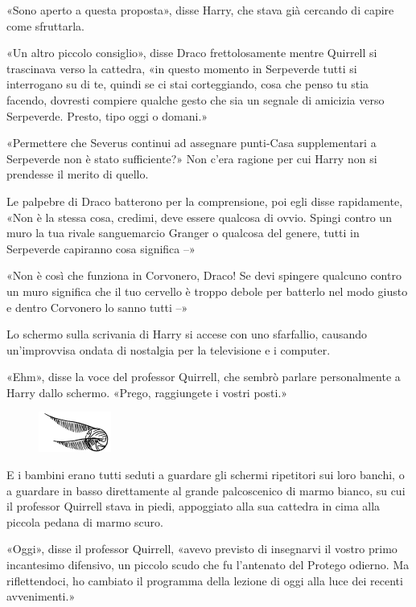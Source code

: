 «Sono aperto a questa proposta», disse Harry, che stava già cercando di capire come sfruttarla.

«Un altro piccolo consiglio», disse Draco frettolosamente mentre Quirrell si trascinava verso la cattedra, «in questo momento in Serpeverde tutti si interrogano su di te, quindi se ci stai corteggiando, cosa che penso tu stia facendo, dovresti compiere qualche gesto che sia un segnale di amicizia verso Serpeverde. Presto, tipo oggi o domani.»

«Permettere che Severus continui ad assegnare punti-Casa supplementari a Serpeverde non è stato sufficiente?» Non c’era ragione per cui Harry non si prendesse il merito di quello.

Le palpebre di Draco batterono per la comprensione, poi egli disse rapidamente, «Non è la stessa cosa, credimi, deve essere qualcosa di ovvio. Spingi contro un muro la tua rivale sanguemarcio Granger o qualcosa del genere, tutti in Serpeverde capiranno cosa significa –»

«Non è così che funziona in Corvonero, Draco! Se devi spingere qualcuno contro un muro significa che il tuo cervello è troppo debole per batterlo nel modo giusto e dentro Corvonero lo sanno tutti –»

Lo schermo sulla scrivania di Harry si accese con uno sfarfallio, causando un’improvvisa ondata di nostalgia per la televisione e i computer.

«Ehm», disse la voce del professor Quirrell, che sembrò parlare personalmente a Harry dallo schermo. «Prego, raggiungete i vostri posti.»

\begin{figure}[h!]
        \includegraphics[scale=0.4]{boccino.png}
        \centering
\end{figure}

E i bambini erano tutti seduti a guardare gli schermi ripetitori sui loro banchi, o a guardare in basso direttamente al grande palcoscenico di marmo bianco, su cui il professor Quirrell stava in piedi, appoggiato alla sua cattedra in cima alla piccola pedana di marmo scuro.

«Oggi», disse il professor Quirrell, «avevo previsto di insegnarvi il vostro primo incantesimo difensivo, un piccolo scudo che fu l’antenato del Protego odierno. Ma riflettendoci, ho cambiato il programma della lezione di oggi alla luce dei recenti avvenimenti.»


